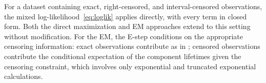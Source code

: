 For a dataset containing exact, right-censored, and interval-censored
observations, the mixed log-likelihood~\eqref{eq:loglik}
applies directly, with every term in closed form.  Both the direct
maximization and EM approaches extend to this setting without
modification.  For the EM, the E-step conditions on the appropriate
censoring information: exact observations contribute as in
; censored observations contribute the
conditional expectation of the component lifetimes given the
censoring constraint, which involves only exponential and truncated
exponential calculations.
